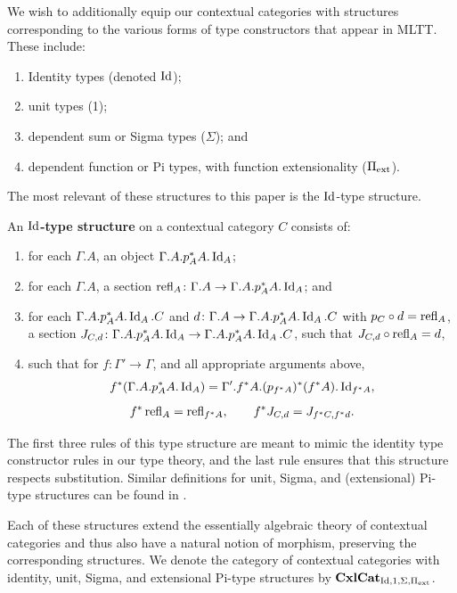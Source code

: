 \documentclass{amsart}
\begin{document}
We wish to additionally equip our contextual categories with structures corresponding to the various forms of type constructors that appear in MLTT. These include:
\begin{enumerate}
    \item Identity types (denoted $\operatorname{Id}$);
    \item unit types (1);
    \item dependent sum or Sigma types ($\Sigma$); and
    \item dependent function or Pi types, with function extensionality ($\Pi_{\operatorname{ext}}$).
\end{enumerate}
The most relevant of these structures to this paper is the $\operatorname{Id}$-type structure.
\begin{defn}
    An \textbf{$\operatorname{Id}$-type structure} on a contextual category $C$ consists of:
    \begin{enumerate}
        \item for each $\Gamma.A$, an object $\Gamma.A.p_A^*A.\operatorname{Id}_A$;
        \item for each $\Gamma.A$, a section $\operatorname{refl}_A\colon\Gamma.A\to\Gamma.A.p_A^*A.\operatorname{Id}_A$; and
        \item for each $\Gamma.A.p_A^*A.\operatorname{Id}_A.C$ and $d\colon\Gamma.A\to\Gamma.A.p_A^*A.\operatorname{Id}_A.C$ with $p_C\circ d=\operatorname{refl}_A$, \newline
        a section $J_{C,d}\colon\Gamma.A.p_A^*A.\operatorname{Id}_A\to\Gamma.A.p_A^*A.\operatorname{Id}_A.C$, such that $J_{C,d}\circ\operatorname{refl}_A=d$,
        \item such that for $f\colon\Gamma'\to\Gamma$, and all appropriate arguments above,
        $$ f^*(\Gamma.A.p_A^*A.\operatorname{Id}_A)=\Gamma'.f^*A.(p_{f^*A})^*(f^*A).\operatorname{Id}_{f^*A}, $$
        $$ f^*\operatorname{refl}_A=\operatorname{refl}_{f^*A},\qquad f^*J_{C,d}=J_{f^*C,f^*d}. $$
    \end{enumerate}
\end{defn}
The first three rules of this type structure are meant to mimic the identity type constructor rules in our type theory, and the last rule ensures that this structure respects substitution. Similar definitions for unit, Sigma, and (extensional) Pi-type structures can be found in \cite[Appendix B]{KL21}.

Each of these structures extend the essentially algebraic theory of contextual categories and thus also have a natural notion of morphism, preserving the corresponding structures. We denote the category of contextual categories with identity, unit, Sigma, and extensional Pi-type structures by $\operatorname{\mathbf{CxlCat}}_{\operatorname{Id},1,\Sigma,\Pi_{\operatorname{ext}}}$.
\end{document}
